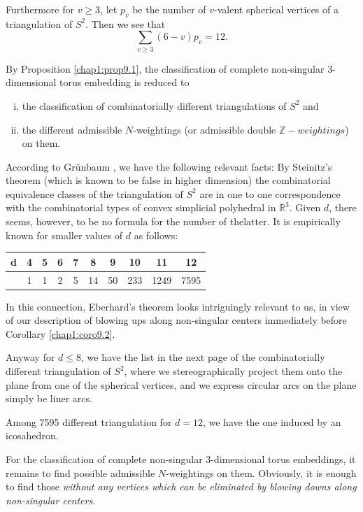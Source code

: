 Furthermore for $v\ge 3$, let $p_v$ be the number of $v$-valent 
spherical vertices of a triangulation of $S^2$. Then we see that  
\begin{equation*}
\sum_{v\ge 3}(6-v)p_v=12.\tag{**} 
\end{equation*}

By Proposition \ref{chap1:prop9.1}, the classification of complete non-singular
3-dimensional torus embedding is reduced to 
\begin{enumerate}[(i)]
\item the classification of combinatorially different triangulations
  of $S^2$ and  

\item the different admissible $N$-weightings (or admissible double
  $\mathbb{Z}-weightings$) on them. 
\end{enumerate}

According to Gr\"unbaum \cite[Chap.13]{keyG3} \cite{keyG4}, we have the following
relevant facts: By Steinitz's theorem (which is known to be false in
higher dimension) the combinatorial equivalence classes of the
triangulation of $S^2$ are in one to one correspondence with the
combinatorial types of convex simplicial polyhedral in $\mathbb{R}^3$. Given
$d$, there seems, however, to be no formula for the number of
the\pageoriginale latter. It is empirically known for smaller values
of $d$ as follows: 
\begin{center}
\begin{tabular}{c|c|c|c|c|c|c|c|c|c|}
d & 4 & 5 & 6 & 7 & 8 & 9 & 10 & 11 & 12\\
\hline
& 1 & 1 & 2 & 5 & 14 & 50 & 233 & 1249 & 7595
\end{tabular} 
\end{center}
 
 \noindent
 In this connection, Eberhard's theorem \cite[13.3]{keyG3} looks
 intriguingly relevant to us, in view of our description of blowing
 ups along non-singular centers immediately before Corollary \ref{chap1:coro9.2}. 
 
 Anyway for $d\le 8$, we have the list in the next page of the
 combinatorially different triangulation of $S^2$, where we
 stereographically project them onto the plane from one of the
 spherical vertices, and we express circular arcs on the plane simply
 be liner arcs. 
 
 Among 7595 different triangulation for $d = 12$, we have the one
 induced by an icosahedron. 

For the classification of complete non-singular 3-dimensional torus
embeddings, it remains to find possible admissible $N$-weightings on
them. Obviously, it is enough to find those \textit{without any
  vertices which can be eliminated by blowing downs along non-singular
  centers}. 

